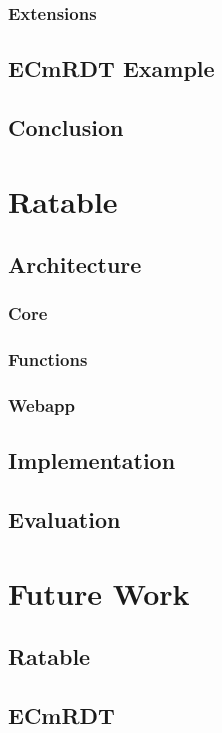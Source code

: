 \documentclass[
	ngerman,
	ruledheaders=section,   %
	class=report,		    %
	thesis={type=bachelor}, %
	accentcolor=9c,			%
	custommargins=false,    %
	marginpar=false,        %
	parskip=half-,          %
	fontsize=11pt,          %
]{tudapub}
\begin{document}
\subsection{Extensions}

\section{ECmRDT Example}
\section{Conclusion}

\chapter{Ratable}
\section{Architecture}
\subsection{Core}
\subsection{Functions}
\subsection{Webapp}
\section{Implementation}
\section{Evaluation}

\chapter{Future Work}
\section{Ratable}
\section{ECmRDT}

\printbibliography
\end{document}
